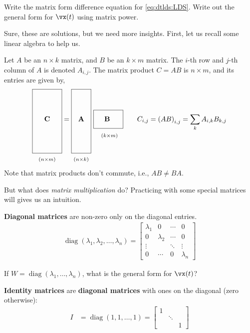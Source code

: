 \documentclass[a4paper,11pt]{exam}
\newcommand*{\clapp}[1]{\hbox to 0pt{\hss#1\hss}}
\newcommand*{\mat}[1]{\boldsymbol{\mathrm{#1}}}
\newcommand*{\subdims}[3]{\clapp{\raisebox{#1}[0pt][0pt]{$\scriptstyle(#2 \times #3)$}}}
\newcounter{ct}
\DeclareMathOperator*{\diag}{diag}
\begin{document}
\begin{questions}
\question Write the matrix form difference equation for \eqref{eq:dtlds:LDS}.
\question Write out the general form for $\vx(t)$ using matrix power.

Sure, these are solutions, but we need more insights.
First, let us recall some linear algebra to help us.
\begin{tcolorbox}[colback=black!1!,title=Matrix multiplication]
Let $A$ be an $n \times k$ matrix, and $B$ be an $k \times m$ matrix.
The $i$-th row and $j$-th column of $A$ is denoted $A_{i,j}$.
The matrix product $C = AB$ is $n \times m$, and its entries are given by,
\begin{align}
    \framebox[1.5cm]{\clapp{\raisebox{0pt}[1.5cm][1.5cm]{$\mat C$}}\subdims{-2.0cm} n m} =
    \framebox[1.0cm]{\clapp{\raisebox{0pt}[1.5cm][1.5cm]{$\mat A$}}\subdims{-2.0cm} n k} \ 
    \framebox[1.5cm]{\clapp{\raisebox{0mm}[4.5mm][2.5mm]{$\mat B$}}       \subdims{-8mm} k m}
    \qquad
    C_{i,j} = \left(
    A
    B
    \right)_{i,j}
    =
    \sum_k A_{i,k} B_{k,j}
    \label{eq:matmult}
\end{align}
\\[3mm]
\noindent
Note that matrix products don't commute, i.e., $AB \neq BA$.
\end{tcolorbox}
\newpage
But what does \emph{matrix multiplication} do?
Practicing with some special matrices will gives us an intuition.

\textbf{Diagonal matrices} are non-zero only on the diagonal entries.
\begin{align}\label{eq:LA:diag}
    \diag(\lambda_1, \lambda_2, \ldots, \lambda_n)
    =
    \begin{bmatrix}
	\lambda_1 & 0 & \cdots & 0 \\
	0 & \lambda_2 & \cdots & 0 \\
	\vdots & & \ddots & \vdots \\
	0 & \cdots & 0 & \lambda_n
    \end{bmatrix}
\end{align}

\question If $W = \diag(\lambda_1, \ldots, \lambda_n)$, what is the general form for $\vx(t)$?
\vspace{\stretch{0.3}}

\textbf{Identity matrices} are \textbf{diagonal matrices} with ones on the diagonal (zero otherwise):
\begin{align}\label{eq:LA:diag:eg}
    I &=
	\diag(1, 1, \ldots, 1)
    =
    \begin{bmatrix}
	1 & & \\
	& \ddots & \\
	& & 1
    \end{bmatrix}
\end{align}


\end{questions}
\end{document}
